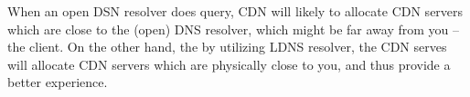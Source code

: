 \documentclass[12pt]{article}
\begin{document}
When an open DSN resolver does query, CDN will likely to allocate CDN servers which are close to the (open) DNS resolver, which might be far away from you -- the client. On the other hand, the by utilizing LDNS resolver, the CDN serves will allocate CDN servers which are physically close to you, and thus provide a better experience.


%
% 
% 
\end{document}
